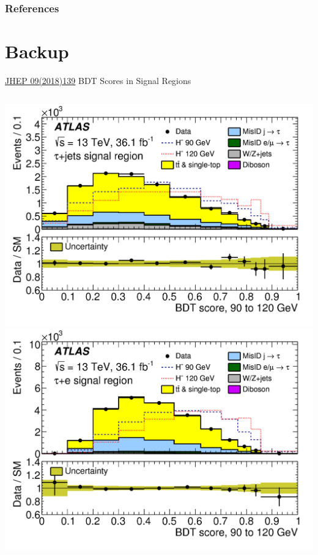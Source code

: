 \documentclass[aspectratio=169,xcolor=table]{beamer}
\begin{document}
  \begin{frame}[allowframebreaks]
          \frametitle{References}
          \printbibliography
  \end{frame}

\section{Backup }
  
  \begin{frame}[t]{\href{https://link.springer.com/article/10.1007/JHEP09(2018)139}{JHEP 09(2018)139} BDT Scores in Signal Regions}
    \begin{columns}[t]
      \includegraphics[height=.4\textheight,keepaspectratio=true]{taujet_SR_2018/taujet_SR_90to120_2018.png}
      \includegraphics[height=.4\textheight,keepaspectratio=true]{tauel_SR_2018/tauel_SR_90to120_2018.png}


\end{columns}
\end{frame}
\end{document}
